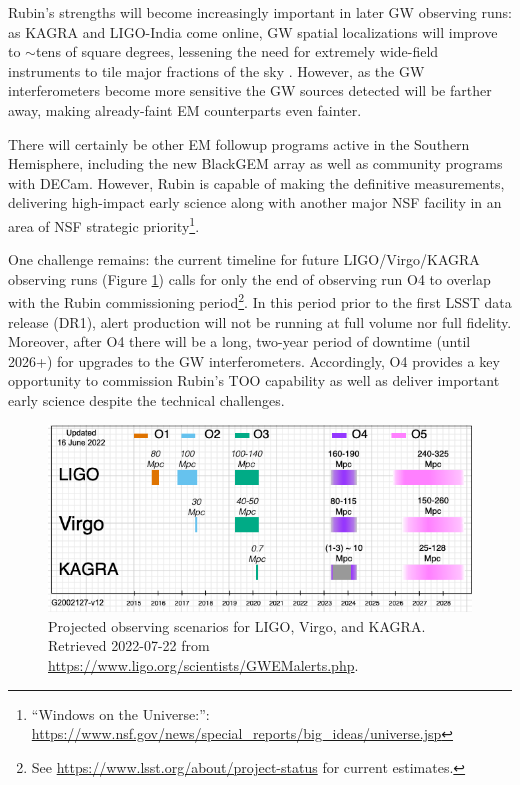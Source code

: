 \documentclass[DM,authoryear,toc]{lsstdoc}
\begin{document}
Rubin's strengths will become increasingly important in later GW observing runs:
as KAGRA and LIGO-India come online, GW spatial localizations will improve to $\sim$tens of square degrees, lessening the need for extremely wide-field instruments to tile major fractions of the sky \citep{2022ApJ...924...54P}.
However, as the GW interferometers become more sensitive the GW sources detected will be farther away, making already-faint EM counterparts even fainter.

There will certainly be other EM followup programs active in the Southern Hemisphere, including the new BlackGEM array as well as community programs with DECam.
However, Rubin is capable of making the definitive measurements, delivering high-impact early science along with another major NSF facility in an area of NSF strategic priority\footnote{``Windows on the Universe:'': \url{https://www.nsf.gov/news/special_reports/big_ideas/universe.jsp}}.

One challenge remains: the current timeline for future LIGO/Virgo/KAGRA observing runs (Figure \ref{fig:scenarios}) calls for only the end of observing run O4 to overlap with the Rubin commissioning period\footnote{See \url{https://www.lsst.org/about/project-status} for current estimates.}.
In this period prior to the first LSST data release (DR1), alert production will not be running at full volume nor full fidelity.
Moreover, after O4 there will be a long, two-year period of downtime (until 2026+) for upgrades to the GW interferometers.
Accordingly, O4 provides a key opportunity to commission Rubin's TOO capability as well as deliver important early science despite the technical challenges.

\begin{figure}
\includegraphics[width=\textwidth]{figures/LVK_run_plan_220615.png}
\caption{Projected observing scenarios for LIGO, Virgo, and KAGRA.  Retrieved 2022-07-22 from
\url{https://www.ligo.org/scientists/GWEMalerts.php}.
	\label{fig:scenarios}}
\end{figure}
\end{document}
